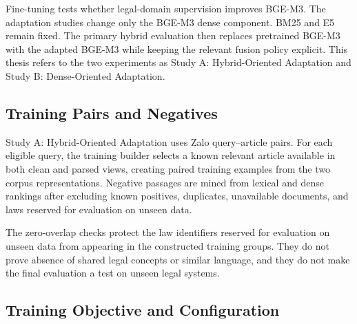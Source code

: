 Fine-tuning tests whether legal-domain supervision improves BGE-M3. The adaptation studies change only the BGE-M3 dense component. BM25 and E5 remain fixed. The primary hybrid evaluation then replaces pretrained BGE-M3 with the adapted BGE-M3 while keeping the relevant fusion policy explicit. This thesis refers to the two experiments as Study A: Hybrid-Oriented Adaptation and Study B: Dense-Oriented Adaptation.

\subsection{Training Pairs and Negatives}

Study A: Hybrid-Oriented Adaptation uses Zalo query--article pairs. For each eligible query, the training builder selects a known relevant article available in both clean and parsed views, creating paired training examples from the two corpus representations. Negative passages are mined from lexical and dense rankings after excluding known positives, duplicates, unavailable documents, and laws reserved for evaluation on unseen data.

\begin{table}[H]
\centering
\footnotesize
{}
\setlength{\tabcolsep}{4pt}
\renewcommand{\arraystretch}{1.05}
\caption[Training groups and protected folds in the completed hybrid fine-tuning study.]{Training groups and protected folds in the completed hybrid fine-tuning study.}\label{tab:4.4}
\vspace{6pt}
\end{table}

The zero-overlap checks protect the law identifiers reserved for evaluation on unseen data from appearing in the constructed training groups. They do not prove absence of shared legal concepts or similar language, and they do not make the final evaluation a test on unseen legal systems.

\subsection{Training Objective and Configuration}

